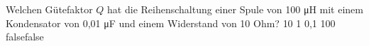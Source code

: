     {Welchen Gütefaktor $Q$ hat die Reihenschaltung einer Spule von 100 \si{\micro\henry} mit einem Kondensator von 0,01 \si{\micro\farad} und einem Widerstand von 10 Ohm?}
    {10}
    {1}
    {0,1}
    {100}
    {false}{false}